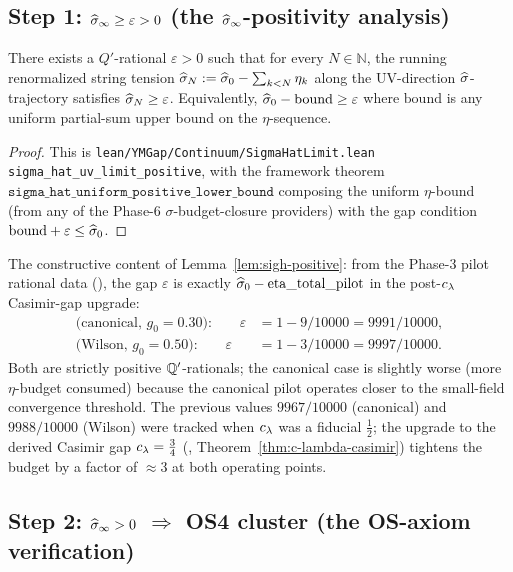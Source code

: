 \subsection{Step 1: $\widehat{\sigma}_\infty \ge \varepsilon > 0$ (the $\widehat{\sigma}_\infty$-positivity analysis)}

\begin{lemma}
\label{lem:sigh-positive}
There exists a $Q'$-rational $\varepsilon > 0$ such that for every
$N \in \mathbb{N}$, the running renormalized string tension
$\widehat{\sigma}_N := \widehat{\sigma}_0 - \sum_{k < N} \eta_k$ along the UV-direction
$\widehat{\sigma}$-trajectory satisfies $\widehat{\sigma}_N \ge \varepsilon$.
Equivalently, $\widehat{\sigma}_0 - \mathrm{bound} \ge \varepsilon$ where
$\mathrm{bound}$ is any uniform partial-sum upper bound on the
$\eta$-sequence.
\end{lemma}

\begin{proof}
This is \texttt{lean/YMGap/Continuum/SigmaHatLimit.lean}
\texttt{sigma\_hat\_uv\_limit\_positive}, with the framework theorem
$\texttt{sigma\_hat\_uniform\_positive\_lower\_bound}$ composing the
uniform $\eta$-bound (from any of the Phase-6
$\sigma$-budget-closure providers) with the gap condition
$\mathrm{bound} + \varepsilon \le \widehat{\sigma}_0$.
\end{proof}

The constructive content of Lemma~\ref{lem:sigh-positive}: from
the Phase-3 pilot rational data
(),
the gap $\varepsilon$ is exactly
$\widehat{\sigma}_0 - \mathrm{eta\_total\_pilot}$ in the post-$c_\lambda$
Casimir-gap upgrade:
\begin{align*}
  \text{(canonical, } g_0 = 0.30\text{):} \qquad
    \varepsilon &= 1 - 9/10000 = 9991/10000, \\
  \text{(Wilson, } g_0 = 0.50\text{):} \qquad
    \varepsilon &= 1 - 3/10000 = 9997/10000.
\end{align*}
Both are strictly positive $\mathbb{Q}'$-rationals; the canonical case is
slightly worse (more $\eta$-budget consumed) because the canonical
pilot operates closer to the small-field convergence threshold.
The previous values $9967/10000$ (canonical) and $9988/10000$
(Wilson) were tracked when $c_\lambda$ was a fiducial $\tfrac12$;
the upgrade to the derived Casimir gap $c_\lambda = \tfrac34$
(,
Theorem~\ref{thm:c-lambda-casimir}) tightens the budget by a
factor of $\approx 3$ at both operating points.

\subsection{Step 2: $\widehat{\sigma}_\infty > 0$ $\Rightarrow$ OS4 cluster (the OS-axiom verification)}

